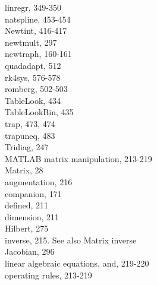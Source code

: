 \documentclass[../main.tex]{subfiles}
\begin{document}
\begin{multicols}{3}
    \hspace*{3mm}linregr, 349-350\\
    \hspace*{3mm}natspline, 453-454\\
    \hspace*{3mm}Newtint, 416-417\\
    \hspace*{3mm}newtmult, 297\\
    \hspace*{3mm}newtraph, 160-161\\
    \hspace*{3mm}quadadapt, 512\\
    \hspace*{3mm}rk4sys, 576-578\\
    \hspace*{3mm}romberg, 502-503\\
    \hspace*{3mm}TableLook, 434\\
    \hspace*{3mm}TableLookBin, 435\\
    \hspace*{3mm}trap, 473, 474\\
    \hspace*{3mm}trapuneq, 483\\
    \hspace*{3mm}Tridiag, 247\\
    MATLAB matrix manipulation, 213-219\\
    Matrix, 28\\
    \hspace*{3mm}augmentation, 216\\
    \hspace*{3mm}companion, 171\\
    \hspace*{3mm}defined, 211\\
    \hspace*{3mm}dimension, 211\\
    \hspace*{3mm}Hilbert, 275\\
    \hspace*{3mm}inverse, 215. See also Matrix inverse\\
    \hspace*{3mm}Jacobian, 296\\
    \hspace*{3mm}linear algebraic equations, and, 219-220\\
    \hspace*{3mm}operating rules, 213-219\\

\end{multicols}
\end{document}
